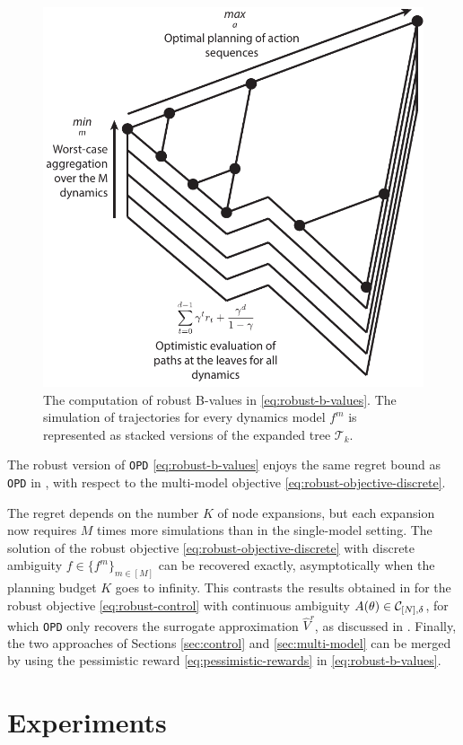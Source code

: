 \begin{figure}
	\centering
	\includegraphics[width=0.45\linewidth]{img/robust-control-tree}
	\caption{The computation of robust B-values in \eqref{eq:robust-b-values}. The simulation of trajectories for every dynamics model $f^m$ is represented as stacked versions of the expanded tree $\mathcal{T}_k$.}
	\label{fig:drop}
\end{figure}

\begin{theorem}
	\label{theorem:drop-regret}
	\begin{leftbar}[theorembar]
	The robust version of \texttt{OPD} \eqref{eq:robust-b-values} enjoys the same regret bound as \texttt{OPD} in , with respect to the multi-model objective \eqref{eq:robust-objective-discrete}.
	\end{leftbar}
\end{theorem}

The regret depends on the number $K$ of node expansions, but each expansion now requires $M$ times more simulations than in the single-model setting. The solution of the robust objective \eqref{eq:robust-objective-discrete} with discrete ambiguity $f\in\{f^m\}_{m\in[M]}$ can be recovered exactly, asymptotically when the planning budget $K$ goes to infinity. This contrasts the results obtained in  for the robust objective \eqref{eq:robust-control} with continuous ambiguity $A(\theta)\in\mathcal{C}_{[N],\delta}$, for which \texttt{OPD} only recovers the surrogate approximation $\hat{V}^r$, as discussed in . Finally, the two approaches of Sections \ref{sec:control} and \ref{sec:multi-model} can be merged by using the pessimistic reward \eqref{eq:pessimistic-rewards} in \eqref{eq:robust-b-values}.

\section{Experiments}
\label{sec:interval-experiments}

